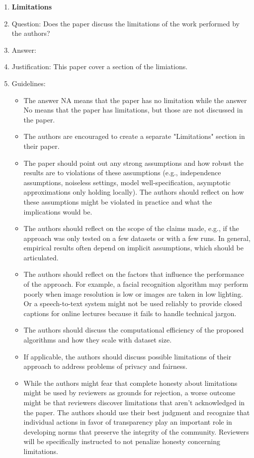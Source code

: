 \documentclass{article}
\begin{document}
\begin{enumerate}
\item {\bf Limitations}
    \item[] Question: Does the paper discuss the limitations of the work performed by the authors?
    \item[] Answer: \answerYes{} %
    \item[] Justification: This paper cover a section of the limiations.
    \item[] Guidelines:
    \begin{itemize}
        \item The answer NA means that the paper has no limitation while the answer No means that the paper has limitations, but those are not discussed in the paper. 
        \item The authors are encouraged to create a separate "Limitations" section in their paper.
        \item The paper should point out any strong assumptions and how robust the results are to violations of these assumptions (e.g., independence assumptions, noiseless settings, model well-specification, asymptotic approximations only holding locally). The authors should reflect on how these assumptions might be violated in practice and what the implications would be.
        \item The authors should reflect on the scope of the claims made, e.g., if the approach was only tested on a few datasets or with a few runs. In general, empirical results often depend on implicit assumptions, which should be articulated.
        \item The authors should reflect on the factors that influence the performance of the approach. For example, a facial recognition algorithm may perform poorly when image resolution is low or images are taken in low lighting. Or a speech-to-text system might not be used reliably to provide closed captions for online lectures because it fails to handle technical jargon.
        \item The authors should discuss the computational efficiency of the proposed algorithms and how they scale with dataset size.
        \item If applicable, the authors should discuss possible limitations of their approach to address problems of privacy and fairness.
        \item While the authors might fear that complete honesty about limitations might be used by reviewers as grounds for rejection, a worse outcome might be that reviewers discover limitations that aren't acknowledged in the paper. The authors should use their best judgment and recognize that individual actions in favor of transparency play an important role in developing norms that preserve the integrity of the community. Reviewers will be specifically instructed to not penalize honesty concerning limitations.
    \end{itemize}


\end{enumerate}
\end{document}

